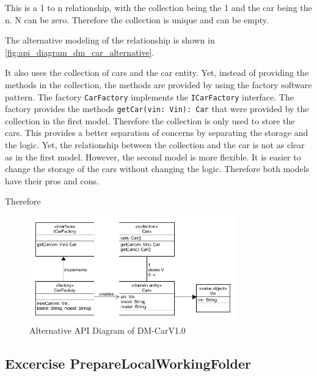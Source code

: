 This is a 1 to n relationship, with the collection being the 1 and the car being the n.
N can be zero.
Therefore the collection is unique and can be empty.

The alternative modeling of the relationship is shown in \autoref{fig:api_diagram_dm_car_alternative}.

It also uses the collection of cars and the car entity.
Yet, instead of providing the methods in the collection, the methods are provided by using the factory software pattern.
The factory \texttt{CarFactory} implements the \texttt{ICarFactory} interface.
The factory provides the methods \texttt{getCar(vin: Vin): Car} that were provided by the collection in the first model.
Therefore the collection is only used to store the cars.
This provides a better separation of concerns by separating the storage and the logic.
Yet, the relationship between the collection and the car is not as clear as in the first model.
However, the second model is more flexible.
It is easier to change the storage of the cars without changing the logic.
Therefore both models have their pros and cons.

Therefore 

\begin{figure}[H]
    \centering
    \includegraphics[width=0.8\textwidth]{figures/microservices/dmCar/apiDiagramDM-CarExtended.png}
    \caption{Alternative API Diagram of DM-CarV1.0}
    \label{fig:api_diagram_dm_car_alternative}
\end{figure}

\subsection{Excercise PrepareLocalWorkingFolder}
\label{subsec:prepare_local_working_folder}
